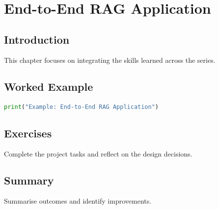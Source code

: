 \chapter{End-to-End RAG Application}
\label{chap:vol11-2}
\section{Introduction}
This chapter focuses on integrating the skills learned across the series.
\section{Worked Example}
\begin{lstlisting}[language=Python]
print("Example: End-to-End RAG Application")
\end{lstlisting}
\section{Exercises}
\begin{exercise}
Complete the project tasks and reflect on the design decisions.
\end{exercise}
\section{Summary}
Summarise outcomes and identify improvements.

